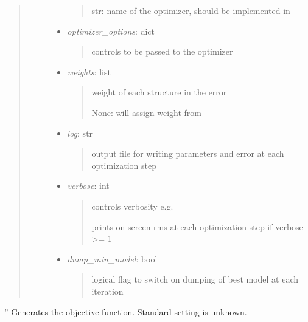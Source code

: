 \documentclass[letterpaper,10pt,english]{sphinxmanual}
\begin{document}
\begin{fulllineitems}
\begin{quote}
\begin{description}
\begin{itemize}
\begin{quote}
str: name of the optimizer, should be implemented in 
{\hyperref[classes:catkernel.CAToptimizer]{}}
\end{quote}

\item {} 
\emph{optimizer\_options}: dict
\begin{quote}

controls to be passed to the optimizer
\end{quote}

\item {} 
\emph{weights}: list
\begin{quote}

weight of each structure in the error

None: will assign weight from 
\end{quote}

\item {} 
\emph{log}: str
\begin{quote}

output file for writing parameters and error at each optimization
step
\end{quote}

\item {} 
\emph{verbose}: int
\begin{quote}

controls verbosity e.g.

prints on screen rms at each optimization step if verbose \textgreater{}= 1
\end{quote}

\item {} 
\emph{dump\_min\_model}: bool
\begin{quote}

logical flag to switch on dumping of best model at each iteration
\end{quote}

\end{itemize}

\end{description}\end{quote}

\begin{fulllineitems}
\label{classes:catkernel.CATKernel.gen_objective}
''
Generates the objective function. Standard setting is unknown.

\end{fulllineitems}


\end{fulllineitems}
\end{document}
